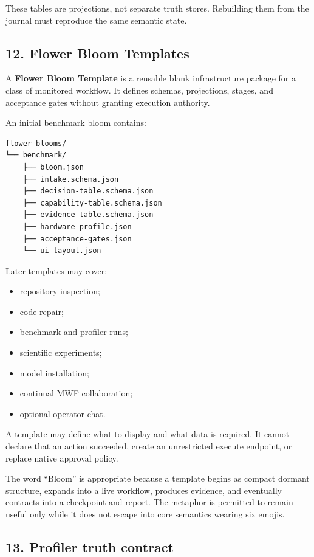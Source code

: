 These tables are projections, not separate truth stores. Rebuilding them from
the journal must reproduce the same semantic state.

\subsection{12. Flower Bloom Templates}

A \textbf{Flower Bloom Template} is a reusable blank infrastructure package for a
class of monitored workflow. It defines schemas, projections, stages, and
acceptance gates without granting execution authority.

An initial benchmark bloom contains:

\begin{verbatim}
flower-blooms/
└── benchmark/
    ├── bloom.json
    ├── intake.schema.json
    ├── decision-table.schema.json
    ├── capability-table.schema.json
    ├── evidence-table.schema.json
    ├── hardware-profile.json
    ├── acceptance-gates.json
    └── ui-layout.json
\end{verbatim}

Later templates may cover:

\begin{itemize}
\item
  repository inspection;
\item
  code repair;
\item
  benchmark and profiler runs;
\item
  scientific experiments;
\item
  model installation;
\item
  continual MWF collaboration;
\item
  optional operator chat.
\end{itemize}

A template may define what to display and what data is required. It cannot
declare that an action succeeded, create an unrestricted execute endpoint, or
replace native approval policy.

The word ``Bloom'' is appropriate because a template begins as compact dormant
structure, expands into a live workflow, produces evidence, and eventually
contracts into a checkpoint and report. The metaphor is permitted to remain
useful only while it does not escape into core semantics wearing six emojis.

\subsection{13. Profiler truth contract}

